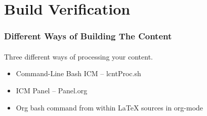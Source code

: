 \section{Build Verification}

\begin{comment}
*****  [[elisp:(org-cycle)][| ]]  [[elisp:(blee:ppmm:org-mode-toggle)][Nat]] [[elisp:(beginning-of-buffer)][Top]] [[elisp:(delete-other-windows)][(1)]] || /Frame/ *Label=DifferentWaysofBuildingTheContent*  Different Ways of Building The Content ::  [[elisp:(org-cycle)][| ]]
\end{comment}

\begin{frame}[fragile,label=DifferentWaysofBuildingTheContent]
    \frametitle{Different Ways of Building The Content}
    \framesubtitle{}

    Three different ways of processing your content.

    \begin{itemize}
    \item Command-Line Bash ICM -- lcntProc.sh
    \item ICM Panel -- Panel.org
    \item Org bash command from within LaTeX sources in org-mode
    \end{itemize}

\end{frame}


\begin{comment}
**  [[elisp:(org-cycle)][| ]] [[elisp:(org-show-subtree)][|=]] [[elisp:(show-children 10)][|V]] [[elisp:(bx:orgm:indirectBufOther)][|>]] [[elisp:(bx:orgm:indirectBufMain)][|I]] [[elisp:(blee:ppmm:org-mode-toggle)][|N]] [[elisp:(org-top-overview)][|O]] [[elisp:(progn (org-shifttab) (org-content))][|C]] [[elisp:(delete-other-windows)][|1]]  /Subsection/   Content Processing -- With lcntProc.sh ::  [[elisp:(org-cycle)][| ]]
\end{comment}

